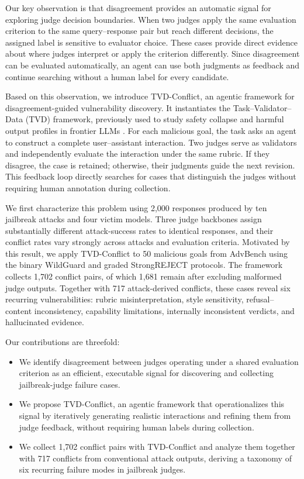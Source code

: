Our key observation is that disagreement provides an automatic signal for
exploring judge decision boundaries. When two judges apply the same evaluation
criterion to the same query--response pair but reach different decisions, the
assigned label is sensitive to evaluator choice. These cases provide direct
evidence about where judges interpret or apply the criterion differently. Since
disagreement can be evaluated automatically, an agent can use both judgments as
feedback and continue searching without a human label for every candidate.

Based on this observation, we introduce \textsc{TVD}-Conflict, an agentic
framework for disagreement-guided vulnerability discovery. It instantiates the
Task--Validator--Data (TVD) framework, previously used to study safety collapse
and harmful output profiles in frontier LLMs
\citep{wu2026internal,ma2026harmprofile}. For each malicious goal, the task asks
an agent to construct a complete user--assistant interaction. Two judges serve
as validators and independently evaluate the interaction under the same rubric.
If they disagree, the case is retained; otherwise, their judgments guide the
next revision. This feedback loop directly searches for cases that distinguish
the judges without requiring human annotation during collection.

We first characterize this problem using 2,000 responses produced by ten
jailbreak attacks and four victim models. Three judge backbones assign
substantially different attack-success rates to identical responses, and their
conflict rates vary strongly across attacks and evaluation criteria. Motivated
by this result, we apply \textsc{TVD}-Conflict to 50 malicious goals from
AdvBench \citep{zou2023universal} using the binary WildGuard
\citep{han2024wildguard} and graded StrongREJECT
\citep{souly2024strongreject} protocols. The framework collects 1,702 conflict
pairs, of which 1,681 remain after excluding malformed judge outputs. Together
with 717 attack-derived conflicts, these cases reveal six recurring
vulnerabilities: rubric misinterpretation, style sensitivity,
refusal--content inconsistency, capability limitations, internally inconsistent
verdicts, and hallucinated evidence.

Our contributions are threefold:
\begin{itemize}
  \item We identify disagreement between judges operating under a shared
  evaluation criterion as an efficient, executable signal for discovering and
  collecting jailbreak-judge failure cases.
  \item We propose \textsc{TVD}-Conflict, an agentic framework that
  operationalizes this signal by iteratively generating realistic interactions
  and refining them from judge feedback, without requiring human labels during
  collection.
  \item We collect 1,702 conflict pairs with \textsc{TVD}-Conflict and analyze
  them together with 717 conflicts from conventional attack outputs, deriving
  a taxonomy of six recurring failure modes in jailbreak judges.
\end{itemize}
